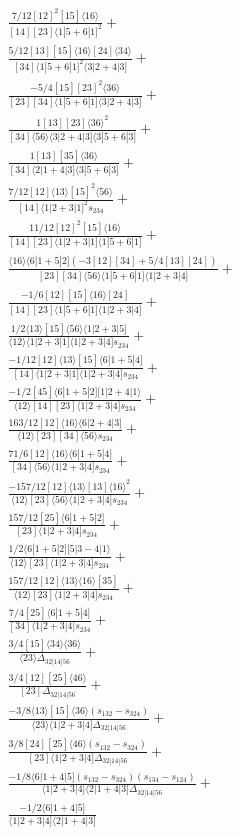 \documentclass[varwidth, border=5pt]{standalone}
\begin{document}
\begin{my}
$\begin{gathered}
\scriptscriptstyle\frac{7/12[12]^2[15]⟨16⟩}{[14][23]⟨1|5+6|1]^2}+\\
\scriptscriptstyle\frac{5/12[13][15]⟨16⟩[24]⟨34⟩}{[34]⟨1|5+6|1]^2⟨3|2+4|3]}+\\
\scriptscriptstyle\frac{-5/4[15][23]^2⟨36⟩}{[23][34]⟨1|5+6|1]⟨3|2+4|3]}+\\
\scriptscriptstyle\frac{1[13][23]⟨36⟩^2}{[34]⟨56⟩⟨3|2+4|3]⟨3|5+6|3]}+\\
\scriptscriptstyle\frac{1[13][35]⟨36⟩}{[34]⟨2|1+4|3]⟨3|5+6|3]}+\\
\scriptscriptstyle\frac{7/12[12]⟨13⟩[15]^2⟨56⟩}{[14]⟨1|2+3|1]^2s_{234}}+\\
\scriptscriptstyle\frac{11/12[12]^2[15]⟨16⟩}{[14][23]⟨1|2+3|1]⟨1|5+6|1]}+\\
\scriptscriptstyle\frac{⟨16⟩⟨6|1+5|2](-3[12][34]+5/4[13][24])}{[23][34]⟨56⟩⟨1|5+6|1]⟨1|2+3|4]}+\\
\scriptscriptstyle\frac{-1/6[12][15]⟨16⟩[24]}{[14][23]⟨1|5+6|1]⟨1|2+3|4]}+\\
\scriptscriptstyle\frac{1/2⟨13⟩[15]⟨56⟩⟨1|2+3|5]}{⟨12⟩⟨1|2+3|1]⟨1|2+3|4]s_{234}}+\\
\scriptscriptstyle\frac{-1/12[12]⟨13⟩[15]⟨6|1+5|4]}{[14]⟨1|2+3|1]⟨1|2+3|4]s_{234}}+\\
\scriptscriptstyle\frac{-1/2[45]⟨6|1+5|2][1|2+4|1⟩}{⟨12⟩[14][23]⟨1|2+3|4]s_{234}}+\\
\scriptscriptstyle\frac{163/12[12]⟨16⟩⟨6|2+4|3]}{⟨12⟩[23][34]⟨56⟩s_{234}}+\\
\scriptscriptstyle\frac{71/6[12]⟨16⟩⟨6|1+5|4]}{[34]⟨56⟩⟨1|2+3|4]s_{234}}+\\
\scriptscriptstyle\frac{-157/12[12]⟨13⟩[13]⟨16⟩^2}{⟨12⟩[23]⟨56⟩⟨1|2+3|4]s_{234}}+\\
\scriptscriptstyle\frac{157/12[25]⟨6|1+5|2]}{[23]⟨1|2+3|4]s_{234}}+\\
\scriptscriptstyle\frac{1/2⟨6|1+5|2][5|3-4|1⟩}{⟨12⟩[23]⟨1|2+3|4]s_{234}}+\\
\scriptscriptstyle\frac{157/12[12]⟨13⟩⟨16⟩[35]}{⟨12⟩[23]⟨1|2+3|4]s_{234}}+\\
\scriptscriptstyle\frac{7/4[25]⟨6|1+5|4]}{[34]⟨1|2+3|4]s_{234}}+\\
\scriptscriptstyle\frac{3/4[15]⟨34⟩⟨36⟩}{⟨23⟩Δ_{32|14|56}}+\\
\scriptscriptstyle\frac{3/4[12][25]⟨46⟩}{[23]Δ_{32|14|56}}+\\
\scriptscriptstyle\frac{-3/8⟨13⟩[15]⟨36⟩(s_{132}-s_{324})}{⟨23⟩⟨1|2+3|4]Δ_{32|14|56}}+\\
\scriptscriptstyle\frac{3/8[24][25]⟨46⟩(s_{132}-s_{324})}{[23]⟨1|2+3|4]Δ_{32|14|56}}+\\
\scriptscriptstyle\frac{-1/8⟨6|1+4|5](s_{132}-s_{324})(s_{134}-s_{124})}{⟨1|2+3|4]⟨2|1+4|3]Δ_{32|14|56}}+\\
\scriptscriptstyle\frac{-1/2⟨6|1+4|5]}{⟨1|2+3|4]⟨2|1+4|3]}\phantom{+}
\end{gathered}$
\end{my}
\end{document}
